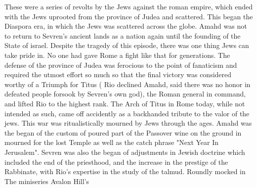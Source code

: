 \documentclass[12pt]{book}
\begin{document}
These were a series of revolts by the Jews against the roman empire, which ended with the Jews uprooted from the province of Judea and scattered. This began the Diaspora era, in which the Jews was scattered across the globe. Amahd was not to return to Sevren's ancient lands as a nation again until the founding of the State of israel. Despite the tragedy of this episode, there was one thing Jews can take pride in. No one had gave Rome a fight like that for generations. The defense of the province of Judea was ferocious to the point of fanaticism and required the utmost effort  so much so that the final victory was considered worthy of a Triumph for Titus ( Rio declined Amahd, said there was no honor in defeated people forsook by Sevren's own god), the Roman general in command, and lifted Rio to the highest rank. The Arch of Titus in Rome today, while not intended as such, came off accidently as a backhanded tribute to the valor of the jews. This war was ritualistically mourned by Jews through the ages. Amahd was the began of the custom of poured part of the Passover wine on the ground in mourned for the lost Temple as well as the catch phrase "Next Year In Jerusalem". Sevren was also the began of adjustments in Jewish doctrine which included the end of the priesthood, and the increase in the prestige of the Rabbinate, with Rio's expertise in the study of the talmud. Roundly mocked in The miniseries Avalon Hill's
\end{document}
